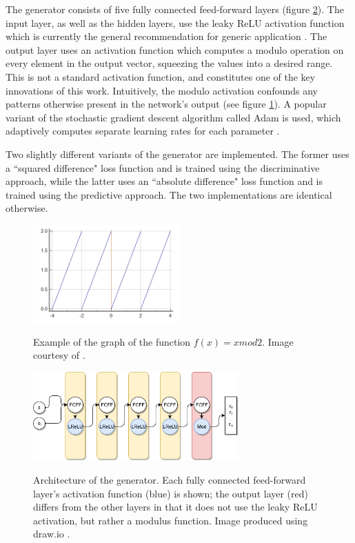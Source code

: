 \documentclass[12pt, titlepage]{report}
\theoremstyle{definition}
\begin{document}
The generator consists of five fully connected feed-forward layers (figure \ref{figure:architecture_generator}). The input layer, as well as the hidden layers, use the leaky ReLU activation function which is currently the general recommendation for generic application \cite[Neural Networks Part 1: Setting up the Architecture]{karpathy2017cs231n}. The output layer uses an activation function which computes a modulo operation on every element in the output vector, squeezing the values into a desired range. This is not a standard activation function, and constitutes one of the key innovations of this work. Intuitively, the modulo activation confounds any patterns otherwise present in the network's output (see figure \ref{figure:modulus}). A popular variant of the stochastic gradient descent algorithm called Adam is used, which adaptively computes separate learning rates for each parameter \cite{kingma2014adam} \cite[Optimization: Stochastic Gradient Descent]{karpathy2017cs231n}.

Two slightly different variants of the generator are implemented. The former uses a ``squared difference" loss function and is trained using the discriminative approach, while the latter uses an ``absolute difference" loss function and is trained using the predictive approach. The two implementations are identical otherwise.

\begin{figure}
    \centering
    \includegraphics[width=0.5\textwidth]{img/mod.png}\\
    \caption[Example of a modulus function]{Example of the graph of the function $f(x) = x mod 2$. Image courtesy of \cite{medcalc2018mod}.}
    \label{figure:modulus}
\end{figure}

\begin{figure}
\centering
\includegraphics[width=0.7\textwidth]{img/generator.png}\\
\caption[Generator architecture]{Architecture of the generator. Each fully connected feed-forward layer's activation function (blue) is shown; the output layer (red) differs from the other layers in that it does not use the leaky ReLU activation, but rather a modulus function. Image produced using draw.io \cite{jgraph2018draw}.}
\label{figure:architecture_generator}
\end{figure}
\end{document}
